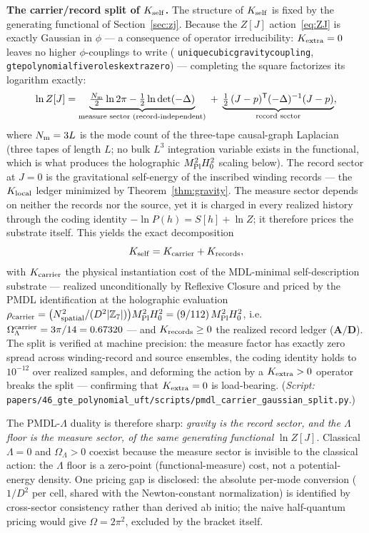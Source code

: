 \documentclass[11pt]{article}
\theoremstyle{remark}
\newcommand{\ZS}{\mathbb{Z}_7}
\newcommand{\lean}[1]{%
  \penalty-100
  \begingroup\def\_{\textunderscore\allowbreak}\texttt{#1}\endgroup}
\newcommand{\OmegaL}{\Omega_\Lambda}
\newcommand{\CatAD}{\textbf{A/D}}
\begin{document}
\noindent\textbf{The carrier/record split of $K_{\rm self}$.}
The structure of $K_{\rm self}$ is fixed by the generating functional of
Section~\ref{sec:zj}.  Because the $Z[J]$ action~\eqref{eq:ZJ} is exactly Gaussian
in $\phi$ --- a consequence of operator irreducibility: $K_{\rm extra} = 0$ leaves
no higher $\phi$-couplings to write
(\lean{unique\_cubic\_gravity\_coupling},
\lean{gte\_polynomial\_five\_roles\_k\_extra\_zero}) ---
completing the square factorizes its logarithm exactly:
\[
  \ln Z[J]
  = \underbrace{\tfrac{N_{\rm m}}{2}\ln 2\pi
      - \tfrac{1}{2}\ln\det(-\Delta)}_{\text{measure sector (record-independent)}}
  \;+\;
  \underbrace{\tfrac{1}{2}\,(J-p)^{\mathsf T}(-\Delta)^{-1}(J-p)}_{\text{record sector}},
\]
where $N_{\rm m} = 3L$ is the mode count of the three-tape causal-graph Laplacian
(three tapes of length $L$; no bulk $L^3$ integration variable exists in the
functional, which is what produces the holographic $M_{\rm Pl}^2 H_0^2$ scaling
below).  The record sector at $J=0$ is the gravitational self-energy of the
inscribed winding records --- the $K_{\rm local}$ ledger minimized by
Theorem~\ref{thm:gravity}.  The measure sector depends on neither the records nor
the source, yet it is charged in every realized history through the coding identity
$-\ln P(h) = S[h] + \ln Z$; it therefore prices the substrate itself.  This yields
the exact decomposition
\[
  K_{\rm self} = K_{\rm carrier} + K_{\rm records},
\]
with $K_{\rm carrier}$ the physical instantiation cost of the MDL-minimal
self-description substrate --- realized unconditionally by Reflexive Closure and
priced by the PMDL identification at the holographic evaluation
$\rho_{\rm carrier} = \bigl(N_{\rm spatial}^2/(D^2|\ZS|)\bigr) M_{\rm Pl}^2 H_0^2
= (9/112)\,M_{\rm Pl}^2 H_0^2$, i.e.\ $\OmegaL^{\rm carrier} = 3\pi/14 = 0.67320$
--- and $K_{\rm records} \geq 0$ the realized record ledger ($\CatAD$).
The split is verified at machine precision: the measure factor has exactly zero
spread across winding-record and source ensembles, the coding identity holds to
$10^{-12}$ over realized samples, and deforming the action by a $K_{\rm extra}>0$
operator breaks the split --- confirming that $K_{\rm extra}=0$ is load-bearing.
(\textit{Script:} \texttt{papers/46\_gte\_polynomial\_uft/scripts/pmdl\_carrier\_gaussian\_split.py}.)

The PMDL-$\Lambda$ duality is therefore sharp: \emph{gravity is the record sector,
and the $\Lambda$ floor is the measure sector, of the same generating functional}
$\ln Z[J]$.  Classical $\Lambda = 0$ and $\OmegaL > 0$ coexist because the measure
sector is invisible to the classical action: the $\Lambda$ floor is a zero-point
(functional-measure) cost, not a potential-energy density.  One pricing gap is
disclosed: the absolute per-mode conversion ($1/D^2$ per cell, shared with the
Newton-constant normalization) is identified by cross-sector consistency rather
than derived ab initio; the naive half-quantum pricing would give $\Omega = 2\pi^2$,
excluded by the bracket itself.
\end{document}
